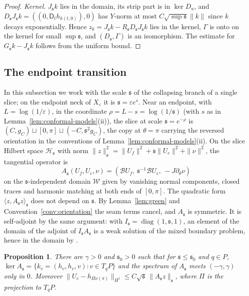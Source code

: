 \documentclass[11pt]{amsart}
\newtheorem{proposition}[theorem]{Proposition}
\theoremstyle{definition}
\theoremstyle{remark}
\theoremstyle{plain}
\numberwithin{equation}{section}
\newcommand{\eps}{\varepsilon}
\begin{document}
\begin{proof}
\emph{Kernel.} $J_{\mathfrak s} k$ lies in the domain, its strip part is in
$\ker D_u$, and $D_{\mathfrak s} J_{\mathfrak s} k=((0,\mathsf D_th_{k(t,0)}),0)$ has
$Y$-norm at most $C\sqrt{\sup{\mathfrak s}}\|k\|$ since $k$ decays
exponentially. Hence $z_k=J_{\mathfrak s} k-R_{\mathfrak s} D_{\mathfrak s} J_{\mathfrak s} k$ lies in
the kernel, $\Gamma$ is onto on the kernel for small $\sup{\mathfrak s}$, and
$(D_{\mathfrak s},\Gamma)$ is an isomorphism. The estimate for $G_{\mathfrak s}
k-J_{\mathfrak s} k$ follows from the uniform bound.
\end{proof}

\subsection{The endpoint transition}\label{subsec:transition}

In this subsection we work with the scale ${\mathfrak s}$ of the collapsing branch of a
single slice; on the endpoint neck of $X_\eps$ it is ${\mathfrak s}=\eps e^s$. Near an
endpoint, with $L=\log(1/\eps)$, in the coordinate $\rho=L-s=\log(1/{\mathfrak s})$ (with $s$ as in Lemma~\ref{lem:conformal-models}(ii)), the
slice at scale ${\mathfrak s}=e^{-\rho}$
is $(C,g_C)\sqcup[0,\pi]\sqcup(-C,{\mathfrak s}^2g_C)$, the copy at $\theta=\pi$ carrying the
reversed orientation in the conventions of Lemma~\ref{lem:conformal-models}(ii). On the slice Hilbert space
$\mathcal H_{\mathfrak s}$ with norm $\|z\|_{\mathfrak s}^2=\|U_f\|^2+{\mathfrak s}\|U_c\|^2+\|\nu\|^2$, the
tangential operator is
\[
A_{\mathfrak s}(U_f,U_c,\nu)=(\mathcal B U_f,\ {\mathfrak s}^{-1}\mathcal BU_c,\
-J\partial_\theta\nu)
\]
on the ${\mathfrak s}$-independent domain $\mathcal W$ given by vanishing normal
components, closed traces and harmonic matching at both ends of $[0,\pi]$.
The quadratic form $\langle z,A_{\mathfrak s} z\rangle_{\mathfrak s}$ does not depend on ${\mathfrak s}$.
By Lemma~\ref{lem:green} and Convention~\ref{conv:orientation} the seam
terms cancel, and $A_{\mathfrak s}$ is symmetric. It is self-adjoint by the same
argument: with $I_{\mathfrak s}=\operatorname{diag}(1,{\mathfrak s},1)$, an element of the domain of
the adjoint of $I_{\mathfrak s} A_{\mathfrak s}$ is a weak solution of the mixed boundary problem,
hence in the domain by \cite[Theorem~4.17 and Remark~4.19]{DFL}.

\begin{proposition}\label{prop:transition-gap}
There are $\gamma>0$ and ${\mathfrak s}_0>0$ such that for ${\mathfrak s}\le{\mathfrak s}_0$ and
$q\in P$, $\ker A_{\mathfrak s}=\{k_v=(h_v,h_v,v):v\in T_qP\}$ and the spectrum
of $A_{\mathfrak s}$ meets $(-\gamma,\gamma)$ only in $0$. Moreover
$\|U_c-h_{\Pi\nu(\pi)}\|_{H^1}\le C\sqrt{\mathfrak s}\,\|A_{\mathfrak s} z\|_{\mathfrak s}$, where
$\Pi$ is the projection to $T_qP$.
\end{proposition}
\end{document}
